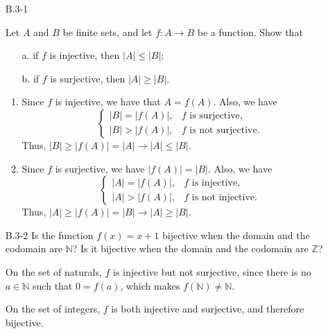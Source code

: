 \begin{enumerate}

\item[B.3{-}1]{Let $A$ and $B$ be finite sets, and let $f : A \rightarrow B$ be
a function. Show that
\begin{enumerate}
\item[a.] if $f$ is injective, then $|A| \le |B|$;
\item[b.] if $f$ is surjective, then $|A| \ge |B|$.
\end{enumerate}
}

\begin{framed}
\begin{enumerate}
  \item Since $f$ is injective, we have that $A = f(A)$. Also, we have
    \begin{equation*}
    \begin{cases}
      |B| = |f(A)|, & f \text{ is surjective},\\
      |B| > |f(A)|, & f \text{ is not surjective}.
    \end{cases}
    \end{equation*}
    Thus, $|B| \ge |f(A)| = |A| \rightarrow |A| \le |B|$.
  \item Since $f$ is surjective, we have $|f(A)| = |B|$. Also, we have
    \begin{equation*}
    \begin{cases}
      |A| = |f(A)|, & f \text{ is injective},\\
      |A| > |f(A)|, & f \text{ is not injective}.
    \end{cases}
    \end{equation*}
    Thus, $|A| \ge |f(A)| = |B| \rightarrow |A| \ge |B|$.
\end{enumerate}
\end{framed}

\item[B.3{-}2]{Is the function $f(x) = x + 1$ bijective when the domain and the
codomain are $\mathbb{N}$? Is it bijective when the domain and the codomain are
$\mathbb{Z}$?}

\begin{framed}
On the set of naturals, $f$ is injective but not surjective, since there is no
$a \in \mathbb{N}$ such that $0 = f(a)$, which makes
$f(\mathbb{N}) \neq \mathbb{N}$.

On the set of integers, $f$ is both injective and surjective, and therefore
bijective.
\end{framed}


\end{enumerate}
